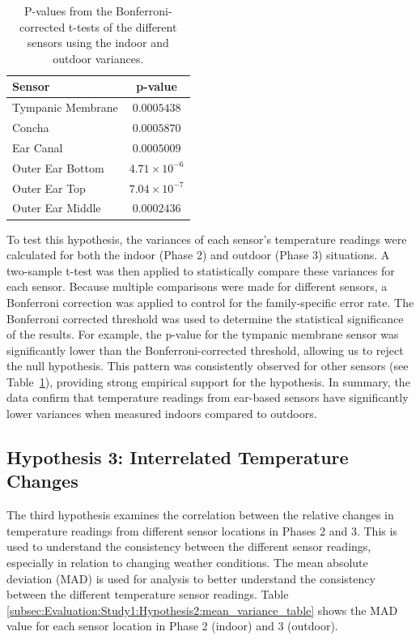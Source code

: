 \begin{table}[h]
\centering
\begin{tabularx}{\textwidth}{|X|c|}
\hline
\textbf{Sensor} & \textbf{p-value} \\
\hline
Tympanic Membrane & \(0.0005438\) \\
Concha & \(0.0005870\) \\
Ear Canal & \(0.0005009\) \\
Outer Ear Bottom & \(4.71 \times 10^{-6}\) \\
Outer Ear Top & \(7.04 \times 10^{-7}\) \\
Outer Ear Middle & \(0.0002436\) \\
\hline
\end{tabularx}
\caption{P-values from the Bonferroni-corrected t-tests of the different sensors using the indoor and outdoor variances.}
\label{subsec:Evaluation:Study1:Hypothesis2:pvalues}
\end{table}

To test this hypothesis, the variances of each sensor's temperature readings were calculated for both the indoor (Phase 2) and outdoor (Phase 3) situations.
A two-sample t-test was then applied to statistically compare these variances for each sensor.
Because multiple comparisons were made for different sensors, a Bonferroni correction was applied to control for the family-specific error rate.
The Bonferroni corrected threshold was used to determine the statistical significance of the results.
For example, the p-value for the tympanic membrane sensor was significantly lower than the Bonferroni-corrected threshold, allowing us to reject the null hypothesis.
This pattern was consistently observed for other sensors (see Table~\ref{subsec:Evaluation:Study1:Hypothesis2:pvalues}), providing strong empirical support for the hypothesis.
In summary, the data confirm that temperature readings from ear-based sensors have significantly lower variances when measured indoors compared to outdoors.

\subsection{Hypothesis 3: Interrelated Temperature Changes}
\label{subsec:Evaluation:Study1:Hypothesis3}
The third hypothesis examines the correlation between the relative changes in temperature readings from different sensor locations in Phases 2 and 3.
This is used to understand the consistency between the different sensor readings, especially in relation to changing weather conditions.
The mean absolute deviation (MAD) is used for analysis to better understand the consistency between the different temperature sensor readings. 
Table \ref{subsec:Evaluation:Study1:Hypothesis2:mean_variance_table} shows the MAD value for each sensor location in Phase 2 (indoor) and 3 (outdoor).

